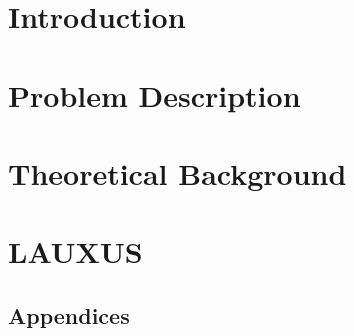 \documentclass[a4paper]{report}
\begin{document}
\tableofcontents
\newpage

\chapter{Introduction}
\label{chapter:introduction}



\chapter{Problem Description}
\label{chapter:problem}






\chapter{Theoretical Background}
\label{chapter:theoric}

% 
% 

\chapter{LAUXUS}
\label{chapter:lauxus}









\nocite{*}




\appendix
\section*{Appendices}
\renewcommand{\thesection}{\Alph{section}}

\end{document}
